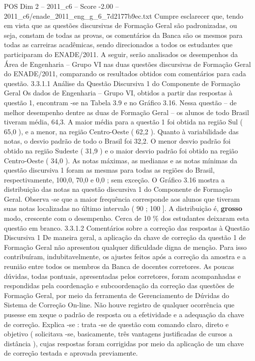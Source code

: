 \begin{textsample}{POS Dim 2 – 2011\_c6 – Score -2.00 – 2011\_c6/enade\_2011\_eng\_g\_6\_7d2177b9ec.txt}
Cumpre esclarecer que, tendo em vista que as questões discursivas de Formação Geral são padronizadas, ou seja, constam de todas as provas, os comentários da Banca são os mesmos para todas as carreiras acadêmicas, sendo direcionados a todos os estudantes que participaram do ENADE/2011.
A seguir, serão analisados os desempenhos da Área de Engenharia – Grupo VI nas duas questões discursivas de Formação Geral do ENADE/2011, comparando os resultados obtidos com comentários para cada questão. 3.3.1.1 Análise da Questão Discursiva 1 do Componente de Formação Geral Os dados de Engenharia – Grupo VI, obtidos a partir das respostas à questão 1, encontram -se na Tabela 3.9 e no Gráfico 3.16.
Nessa questão – de melhor desempenho dentre as duas de Formação Geral – os alunos de todo Brasil tiveram média, 64,3.
A maior média para a questão 1 foi obtida na região Sul ( 65,0 ), e a menor, na região Centro-Oeste ( 62,2 ).
Quanto à variabilidade das notas, o desvio padrão de todo o Brasil foi 32,2.
O menor desvio padrão foi obtido na região Sudeste ( 31,9 ) e o maior desvio padrão foi obtido na região Centro-Oeste ( 34,0 ).
As notas máximas, as medianas e as notas mínimas da questão discursiva 1 foram as mesmas para todas as regiões do Brasil, respectivamente, 100,0, 70,0 e 0,0 ; sem exceção.
O Gráfico 3.16 mostra a distribuição das notas na questão discursiva 1 do Componente de Formação Geral.
Observa -se que a maior frequência corresponde aos alunos que tiveram suas notas localizadas no último intervalo ( 90 ; 100 ].
A distribuição é, \textbf{grosso} modo, crescente com o desempenho.
Cerca de 10 \% dos estudantes deixaram esta questão em branco. 3.3.1.2 Comentários sobre a correção das respostas à Questão Discursiva 1 De maneira geral, a aplicação da chave de correção da questão 1 de Formação Geral não apresentou qualquer dificuldade digna de menção.
Para isso contribuíram, indubitavelmente, os ajustes feitos após a correção da amostra e a reunião entre todos os membros da Banca de docentes corretores.
As poucas dúvidas, todas pontuais, apresentadas pelos corretores, foram acompanhadas e respondidas pela coordenação e subcoordenação da correção das questões de Formação Geral, por meio da ferramenta de Gerenciamento de Dúvidas do Sistema de Correção On-line.
Não houve registro de qualquer ocorrência que pusesse em xeque o padrão de resposta ou a efetividade e a adequação da chave de correção.
Explica -se : trata -se de questão com comando claro, direto e objetivo ( solicitava -se, basicamente, três vantagens justificadas de cursos a distância ), cujas respostas foram corrigidas por meio da aplicação de um chave de correção testada e aprovada previamente.

\end{textsample}
